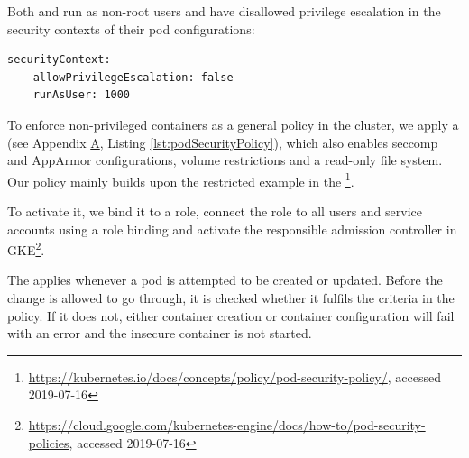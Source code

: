 Both  and  run as non-root users and have disallowed privilege escalation in the security contexts of their pod configurations:

\begin{verbatim}
securityContext:
    allowPrivilegeEscalation: false
    runAsUser: 1000
\end{verbatim}

To enforce non-privileged containers as a general policy in the cluster, we apply a  (see Appendix \hyperref[apx:A]{A}, Listing \ref{lst:podSecurityPolicy}), which also enables seccomp and AppArmor configurations, volume restrictions and a read-only file system. Our policy mainly builds upon the restricted example in the \textcite{k8sdocs}\footnote{\url{https://kubernetes.io/docs/concepts/policy/pod-security-policy/}, accessed 2019-07-16}.

To activate it, we bind it to a role, connect the role to all users and service accounts using a role binding and activate the responsible admission controller in \ac{GKE}\footnote{\url{https://cloud.google.com/kubernetes-engine/docs/how-to/pod-security-policies}, accessed 2019-07-16}. 

The  applies whenever a pod is attempted to be created or updated. Before the change is allowed to go through, it is checked whether it fulfils the criteria in the policy. If it does not, either container creation or container configuration will fail with an error and the insecure container is not started. 

